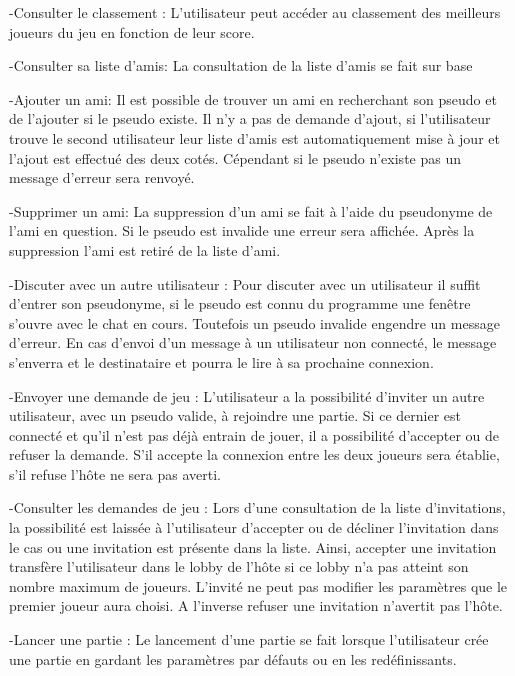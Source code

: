 \documentclass[utf8]{article}
\begin{document}
\begin{itemsize}
\par
\item -Consulter le classement : L'utilisateur peut accéder au classement des meilleurs joueurs du jeu en fonction de leur score.
\item -Consulter sa liste d'amis: La consultation de la liste d'amis se fait sur base
\item -Ajouter un ami: Il est possible de trouver un ami en recherchant son pseudo et de l'ajouter si le pseudo existe. Il n'y a pas de demande d'ajout, si l'utilisateur trouve le second utilisateur leur liste d'amis est automatiquement mise à jour et l'ajout est effectué des deux cotés.
Cépendant si le pseudo n'existe pas un message d'erreur sera renvoyé.
\item-Supprimer un ami: La suppression d'un ami se fait à l'aide du pseudonyme de l'ami en question. Si le pseudo est invalide une erreur sera affichée.
Après la suppression l'ami est retiré de la liste d'ami.
\item-Discuter avec un autre utilisateur : Pour discuter avec un utilisateur il suffit d'entrer son pseudonyme, si le pseudo est connu du programme une fenêtre s'ouvre avec le chat en cours. Toutefois un pseudo invalide engendre un message d'erreur.
En cas d'envoi d'un message à un utilisateur non connecté, le message s'enverra et le destinataire et pourra le lire à sa prochaine connexion.
\item-Envoyer une demande de jeu : L'utilisateur a la possibilité d'inviter un autre utilisateur, avec un pseudo valide, à rejoindre une partie. Si ce dernier est connecté et qu'il n'est pas déjà entrain de jouer, il a possibilité d'accepter ou de refuser la demande. S'il accepte la connexion entre les deux joueurs sera établie, s'il refuse l'hôte ne sera pas averti.
\item-Consulter les demandes de jeu :
Lors d'une consultation de la liste d'invitations, la possibilité est laissée à l'utilisateur d'accepter ou de décliner l'invitation dans le cas ou une invitation est présente dans la liste. Ainsi, accepter une invitation transfère l'utilisateur dans le lobby de l'hôte si ce lobby n'a pas atteint son nombre maximum de joueurs.
L'invité ne peut pas modifier les paramètres que le premier joueur aura choisi.
A l'inverse refuser une invitation n'avertit pas l'hôte. 
\item-Lancer une partie : Le lancement d'une partie se fait lorsque l'utilisateur crée une partie en gardant les paramètres par défauts ou en les redéfinissants.
\end{itemsize}
\end{document}
